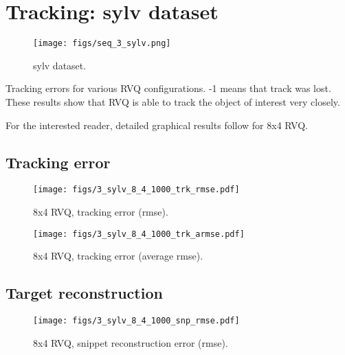 \clearpage
\newpage
\section{Tracking: sylv dataset} 
								\begin{figure}[h!]
								\centering
								\texttt{[image: figs/seq\_3\_sylv.png]}
								\caption{sylv dataset.}
								\label{fig:seq_3_sylv}
								\end{figure}



\begin{table}[h]
\centering

\caption{Tracking errors for various RVQ configurations.  -1 means that track was lost.  These results show that RVQ is able to track the object of interest very closely.}
\end{table}

For the interested reader, detailed graphical results follow for 8x4 RVQ.
\clearpage
\newpage
\subsection{Tracking error}

								\begin{figure}[h!]
								\centering
								\texttt{[image: figs/3\_sylv\_8\_4\_1000\_trk\_rmse.pdf]}
								\caption{8x4 RVQ, tracking error (rmse).}
								\label{fig:3_sylv_8_4_1000_trk_rmse}
								\end{figure}


								\begin{figure}[h!]
								\centering
								\texttt{[image: figs/3\_sylv\_8\_4\_1000\_trk\_armse.pdf]}
								\caption{8x4 RVQ, tracking error (average rmse).}
								\label{fig:3_sylv_8_4_1000_trk_avg_rmse}
								\end{figure}

\clearpage
\newpage
\subsection{Target reconstruction}

								\begin{figure}[h!]
								\centering
								\texttt{[image: figs/3\_sylv\_8\_4\_1000\_snp\_rmse.pdf]}
								\caption{8x4 RVQ, snippet reconstruction error (rmse).}
								\label{fig:3_sylv_8_4_1000_snp_rmse}
								\end{figure}


